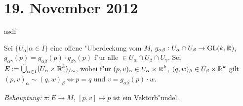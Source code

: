 \section{19. November 2012}
\setcounter{Aufg}{0} %
\setcounter{Loes}{0}

\begin{Loes}
asdf
\end{Loes}

\begin{Loes}
Sei $\{U_\alpha | \alpha \in I\}$ eine offene "Uberdeckung vom $M$, $g_{\alpha\beta}: U_\alpha \cap U_\beta \to \operatorname{GL}(k,\operatorname{\mathbb{R}})$, $g_{\alpha\gamma}(p) = g_{\alpha\beta}(p) \cdot g_{\beta\gamma}(p)$ f"ur alle $ \in U_\alpha \cap U_\beta \cap U_\gamma$. Sei $E := \dot\bigcup_{\alpha \in I} (U_\alpha \times \operatorname{\mathbb{R}}^k)_{/\sim}$, wobei f"ur $(p,v)_\alpha \in U_\alpha \times \operatorname{\mathbb{R}}^k$, $(q,w)_\beta \in U_\beta \times \operatorname{\mathbb{R}}^k$ gilt $(p,v)_\alpha \sim (q,w)_\beta \Leftrightarrow p=q$ und $v = g_{\alpha\beta}(p) \cdot w$.

\emph{Behauptung:} $\pi: E \to M$, $[p,v] \mapsto p$ ist ein Vektorb"undel.


\end{Loes}
